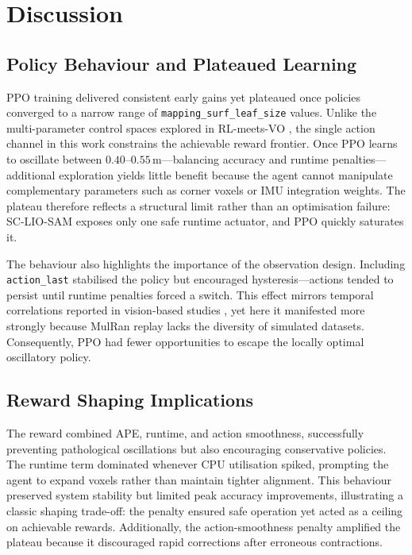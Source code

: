 \chapter[Discussion]{Discussion}
\label{Chap:Discussion}



\section{Policy Behaviour and Plateaued Learning}
PPO training delivered consistent early gains yet plateaued once policies converged to a narrow range of \texttt{mapping\_surf\_leaf\_size} values. Unlike the multi-parameter control spaces explored in RL-meets-VO \cite{nicomessikommer_2024_reinforcement}, the single action channel in this work constrains the achievable reward frontier. Once PPO learns to oscillate between $0.40$--$0.55$\,m—balancing accuracy and runtime penalties—additional exploration yields little benefit because the agent cannot manipulate complementary parameters such as corner voxels or IMU integration weights. The plateau therefore reflects a structural limit rather than an optimisation failure: SC-LIO-SAM \cite{shan_2020_liosam} exposes only one safe runtime actuator, and PPO quickly saturates it.

The behaviour also highlights the importance of the observation design. Including \texttt{action\_last} stabilised the policy but encouraged hysteresis—actions tended to persist until runtime penalties forced a switch. This effect mirrors temporal correlations reported in vision-based studies \cite{nicomessikommer_2024_reinforcement}, yet here it manifested more strongly because MulRan replay \cite{kim_2020_mulran} lacks the diversity of simulated datasets. Consequently, PPO had fewer opportunities to escape the locally optimal oscillatory policy.

\section{Reward Shaping Implications}
The reward combined APE, runtime, and action smoothness, successfully preventing pathological oscillations but also encouraging conservative policies. The runtime term dominated whenever CPU utilisation spiked, prompting the agent to expand voxels rather than maintain tighter alignment. This behaviour preserved system stability but limited peak accuracy improvements, illustrating a classic shaping trade-off: the penalty ensured safe operation yet acted as a ceiling on achievable rewards. Additionally, the action-smoothness penalty amplified the plateau because it discouraged rapid corrections after erroneous contractions.

